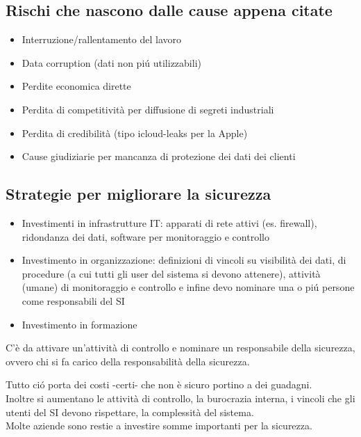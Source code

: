 \subsection{Rischi che nascono dalle cause appena citate}

\begin{itemize}

\item
  Interruzione/rallentamento del lavoro
\item
  Data corruption (dati non pi\'u utilizzabili)
\item
  Perdite economica dirette
\item
  Perdita di competitivit\`a per diffusione di segreti industriali
\item
  Perdita di credibilit\`a (tipo icloud-leaks per la Apple)
\item
  Cause giudiziarie per mancanza di protezione dei dati dei clienti
\end{itemize}

\subsection{Strategie per migliorare la
sicurezza}

\begin{itemize}

\item
  Investimenti in infrastrutture IT: apparati di rete attivi (es. firewall), ridondanza dei dati, software per monitoraggio e controllo
\item
  Investimento in organizzazione: definizioni di vincoli su visibilit\`a dei dati,
  di procedure (a cui tutti gli user del sistema si devono attenere),
  attivit\`a (umane) di monitoraggio e controllo e infine devo nominare
  una o pi\'u persone come responsabili del SI
\item
  Investimento in formazione
\end{itemize}

C'\`e da attivare un'attivit\`a di controllo e nominare un responsabile della 
sicurezza, ovvero chi si fa carico della responsabilit\`a della sicurezza.

Tutto ci\'o porta dei costi -certi- che non \`e sicuro portino a dei
guadagni.\\
Inoltre si aumentano le attivit\`a di controllo, la burocrazia interna, i
vincoli che gli utenti del SI devono rispettare, la complessit\`a del
sistema.\\
Molte aziende sono restie a investire somme importanti per la
sicurezza.

